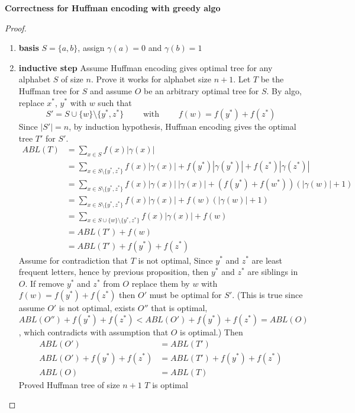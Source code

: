 \documentclass[11pt]{article}
\begin{document}
\begin{example}
\begin{enumerate}
    \begin{proposition*}
      \textbf{Correctness for Huffman encoding with greedy algo}
      \begin{proof}
        $ $\\
        \begin{enumerate}
          \item \textbf{basis} $S = \{ a, b\}$, assign $\gamma(a) = 0$ and $\gamma(b) = 1$
          \item \textbf{inductive step} Assume Huffman encoding gives optimal tree for any alphabet $S$ of size $n$. Prove it works for alphabet size $n+1$. Let $T$ be the Huffman tree for $S$ and assume $O$ be an arbitrary optimal tree for $S$. By algo, replace $x^*$, $y^*$ with $w$ such that
          \[
            S' = S \cup \{ w \} \setminus \{ y^* , z^*\} \quad\quad \text{ with } \quad \quad f(w) = f(y^*) + f(z^*)
          \]
          Since $|S'| = n$, by induction hypothesis, Huffman encoding gives the optimal tree $T'$ for $S'$.
          \begin{align*}
            ABL(T) &=  \sum_{x \in S} f(x) |\gamma(x)| \\
            &= \sum_{x\in S \setminus \{ y^*, z^*\}} f(x) | \gamma(x)| + f(y^*) | \gamma(y^*)| + f(z^*)|\gamma(z^*)| \\
            &= \sum_{x\in S \setminus \{ y^*, z^*\}} f(x) | \gamma(x)| \ |\gamma(x)| + (f(y^*) + f(w^*)) (|\gamma(w)| + 1) \\
            &= \sum_{x\in S \setminus \{ y^*, z^*\}} f(x) | \gamma(x)| + f(w) (|\gamma(w)| + 1)\\
            &= \sum_{x\in S \cup \{ w\} \setminus \{ y^*, z^*\}} f(x) | \gamma(x)| + f(w)\\
            &= ABL(T') + f(w) \\
            &= ABL(T') + f(y^*) + f(z^*)
          \end{align*}
          Assume for contradiction that $T$ is not optimal,
          Since $y^*$ and $z^*$ are least frequent letters, hence by previous proposition, then $y^*$ and $z^*$ are siblings in $O$. If remove $y^*$ and $z^*$ from $O$ replace them by $w$ with $f(w) = f(y^*) + f(z^*)$ then $O'$ must be optimal for $S'$. (This is true since assume $O'$ is not optimal, exists $O''$ that is optimal, $ABL(O'') + f(y^*) + f(z^*) < ABL(O') + f(y^*) + f(z^*) = ABL(O)$, which contradicts with assumption that $O$ is optimal.) Then
          \begin{align*}
              ABL(O') &= ABL(T') \\
              ABL(O') + f(y^*) + f(z^*) &= ABL(T') + f(y^*) + f(z^*) \\
              ABL(O) &= ABL(T)
          \end{align*}
          Proved Huffman tree of size $n+1$ $T$ is optimal

        \end{enumerate}
      \end{proof}
    \end{proposition*}
  \end{enumerate}


\end{example}
\end{document}
